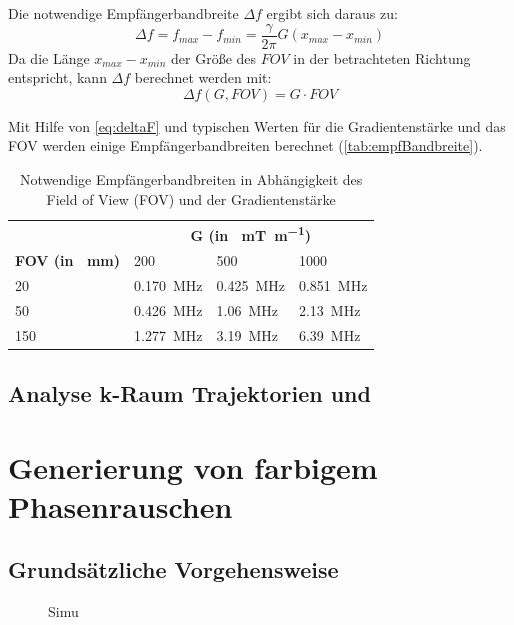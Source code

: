 Die notwendige Empfängerbandbreite $\Delta f$ ergibt sich daraus zu:
\begin{equation}
\Delta f = f_{max}-f_{min} = \frac{\gamma}{2\pi} G (x_{max}-x_{min})
\end{equation}
Da die Länge $x_{max}-x_{min}$ der Größe des $FOV$ in der betrachteten Richtung entspricht, kann $\Delta f$ berechnet werden mit:
\begin{equation}
\label{eq:deltaF}
\Delta f(G, FOV) = G \cdot FOV
\end{equation}

Mit Hilfe von \autoref{eq:deltaF} und typischen Werten für die Gradientenstärke und das FOV werden einige Empfängerbandbreiten berechnet (\autoref{tab:empfBandbreite}).

\begin{table}[H]
	\centering
	\caption{Notwendige Empfängerbandbreiten in Abhängigkeit des Field of View (FOV) und der Gradientenstärke}
	\label{tab:empfBandbreite}
	\begin{tabular}{llll}
		\toprule
		& \multicolumn{3}{c}{\textbf{G (in \SI{}{\milli\tesla\per\meter})}} \\ \cmidrule{2-4}
		\textbf{FOV (in \SI{}{\mm})}& 200 & 500 & 1000 \\
		20 & \SI{0.170}{\mega\hertz} & \SI{0.425}{\mega\hertz} & \SI{0.851}{\mega\hertz} \\
		50 & \SI{0.426}{\mega\hertz} & \SI{1.06}{\mega\hertz} & \SI{2.13}{\mega\hertz} \\
		150 & \SI{1.277}{\mega\hertz} & \SI{3.19}{\mega\hertz} & \SI{6.39}{\mega\hertz} \\
		\bottomrule
	\end{tabular}
\end{table}

\subsection{Analyse k-Raum Trajektorien und}

\section{Generierung von farbigem Phasenrauschen}

\subsection{Grundsätzliche Vorgehensweise}


\begin{figure}[H]
	\centering
	\caption[Simulation]{Simu}
	\label{fig:aaa}
\end{figure}


